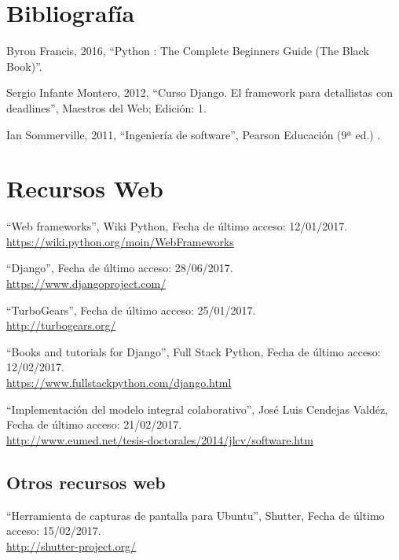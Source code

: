 \section{Bibliografía}




Byron Francis, 2016, ``Python : The Complete Beginners Guide (The Black Book)''. 


Sergio Infante Montero, 2012, ``Curso Django. El framework para detallistas con deadlines'', Maestros del Web; Edición: 1.

Ian Sommerville, 2011, ``Ingeniería de software'', Pearson Educación (9ª ed.) .





\section{Recursos Web}

``Web frameworks'', Wiki Python, Fecha de último acceso: 12/01/2017.\\\href{https://wiki.python.org/moin/WebFrameworks}{https://wiki.python.org/moin/WebFrameworks}

``Django'', Fecha de último acceso: 28/06/2017.\\\href{https://www.djangoproject.com/}{https://www.djangoproject.com/}

``TurboGears'', Fecha de último acceso: 25/01/2017.\\\href{http://turbogears.org/}{http://turbogears.org/}


``Books and tutorials for Django'', Full Stack Python, Fecha de último acceso: 12/02/2017.\\\href{https://www.fullstackpython.com/django.html}{https://www.fullstackpython.com/django.html}

``Implementación del modelo integral colaborativo'', José Luis Cendejas Valdéz, Fecha de último acceso: 21/02/2017.\\\href{http://www.eumed.net/tesis-doctorales/2014/jlcv/software.htm}{http://www.eumed.net/tesis-doctorales/2014/jlcv/software.htm}


\subsection{Otros recursos web}

``Herramienta de capturas de pantalla para Ubuntu'', Shutter, Fecha de último acceso: 15/02/2017.\\\href{http://shutter-project.org/}{http://shutter-project.org/}
